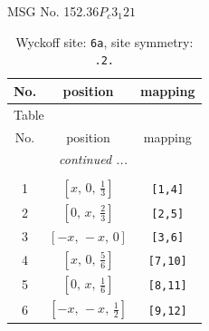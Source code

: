 \documentclass[fleqn,8pt]{jsarticle}
\begin{document}
\setcounter{MaxMatrixCols}{32}

\renewcommand{\tablename}{Table~}
\renewcommand{\figurename}{Figure~}
\begin{center}
\LARGE
MSG No. 152.36\quad$P_{c}3_{1}21$
\end{center}
\renewcommand{\arraystretch}{1.2}
\begin{longtable}{ccc}
\caption{Wyckoff site: {\tt 6a}, site symmetry: {\tt .2.}}
 \\
 \hline \hline
No. & position & mapping \\ \hline \endfirsthead

\multicolumn{2}{l}{\tablename\ \thetable{}} \\
 \hline \hline
No. & position & mapping \\ \hline \endhead

 \hline \hline
\multicolumn{2}{r}{\footnotesize\it continued ...} \\ \endfoot

 \hline \hline
\multicolumn{2}{r}{} \\ \endlastfoot

1 & $\left[ x,\, 0,\, \frac{1}{3} \right]$ & {\tt [1,4]} \\ \hline
2 & $\left[ 0,\, x,\, \frac{2}{3} \right]$ & {\tt [2,5]} \\ \hline
3 & $\left[ - x,\, - x,\, 0 \right]$ & {\tt [3,6]} \\ \hline
4 & $\left[ x,\, 0,\, \frac{5}{6} \right]$ & {\tt [7,10]} \\ \hline
5 & $\left[ 0,\, x,\, \frac{1}{6} \right]$ & {\tt [8,11]} \\ \hline
6 & $\left[ - x,\, - x,\, \frac{1}{2} \right]$ & {\tt [9,12]} \\
\end{longtable}
\renewcommand{\arraystretch}{1.2}
\end{document}
